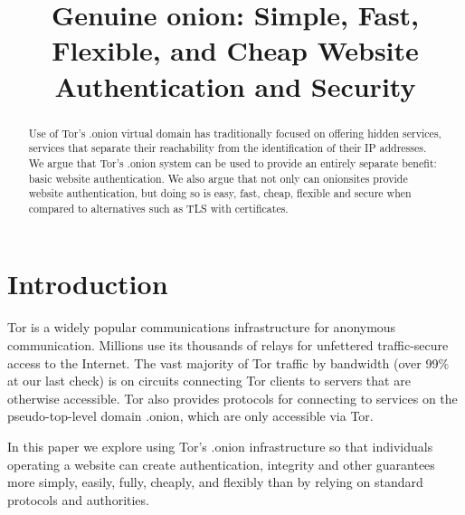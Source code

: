 \documentclass[10pt, conference, compsocconf]{styles/IEEEtran}
\title{Genuine onion: Simple, Fast, Flexible, and Cheap Website Authentication and Security}
\author{
\IEEEauthorblockN{Paul Syverson}
\IEEEauthorblockA{U.S. Naval Research Laboratory\\
paul.syverson@nrl.navy.mil}
\and
\IEEEauthorblockN{Griffin Boyce}
\IEEEauthorblockA{Open Internet Tools Project\\
griffin@cryptolab.net}
}
\begin{document}
\maketitle

\begin{abstract}
  Use of Tor's .onion virtual domain has traditionally focused on
  offering hidden services, services that separate their reachability
  from the identification of their IP addresses. We argue that Tor's
  .onion system can be used to provide an entirely separate benefit:
  basic website authentication. We also argue that not only can
  onionsites provide website authentication, but doing so is easy,
  fast, cheap, flexible and secure when compared to alternatives such
  as TLS with certificates.
\end{abstract}

% 
% 
% 
% 
% 
% 
% 
% 
% 
% 
% 

\section{Introduction}
Tor is a widely popular communications infrastructure for anonymous
communication. Millions use its thousands of relays for unfettered
traffic-secure access to the Internet. The vast majority of Tor
traffic by bandwidth (over 99\% at our last check) is on circuits
connecting Tor clients to servers that are otherwise accessible.  Tor
also provides protocols for connecting to services on the
pseudo-top-level domain .onion, which are only accessible via Tor.

In this paper we explore using Tor's .onion infrastructure so that
individuals operating a website can create authentication, integrity
and other guarantees more simply, easily, fully, cheaply, and flexibly
than by relying on standard protocols and authorities.
\end{document}
